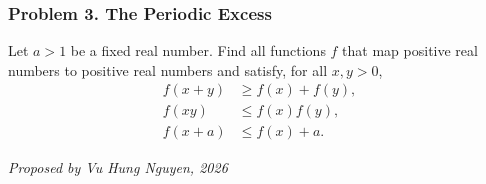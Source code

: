 \subsubsection*{Problem 3. The Periodic Excess}

\begin{exercisebox}[hard]

Let $a>1$ be a fixed real number. Find all functions $f$ that map
positive real numbers to positive real numbers and satisfy, for all
$x,y>0$,
\[
\begin{aligned}
f(x+y)&\geq f(x)+f(y),\\
f(xy)&\leq f(x)f(y),\\
f(x+a)&\leq f(x)+a.
\end{aligned}
\]

\begin{flushright}
\textit{Proposed by Vu Hung Nguyen, 2026}
\end{flushright}


\end{exercisebox}